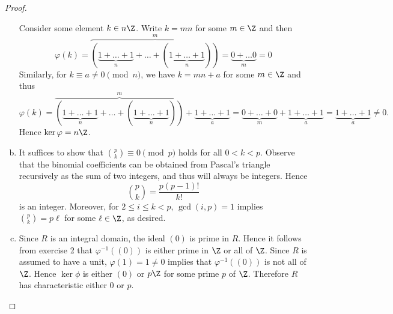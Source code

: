 \documentclass[10pt]{amsart}
\begin{document}
\begin{thm}
\begin{proof}
\begin{enumerate}[(a)]
        Consider some element $k \in n\Z$.  
        Write $k = mn$ for some $m \in \Z$ and then
        $$\varphi(k) = \overbrace{(\underbrace{1 + \ldots + 1}_n + \ldots + (\underbrace{1 + \ldots + 1}_n))}^m = \underbrace{0 + \ldots 0}_m = 0$$
        Similarly, for $k \equiv a \neq 0 \pmod{n}$, we have $k = mn + a$ for some $m \in \Z$ and thus
        $$\varphi(k) = \overbrace{(\underbrace{1 + \ldots + 1}_n + \ldots + (\underbrace{1 + \ldots + 1}_n))}^m +\underbrace{1 + \ldots + 1}_a = \underbrace{0 + \ldots + 0}_m + \underbrace{1 + \ldots + 1}_a = \underbrace{1 + \ldots + 1}_a \neq 0.$$
        Hence $\ker\varphi = n\Z$.
      \item
        It suffices to show that ${p \choose k} \equiv 0 \pmod{p}$ holds for all $0 < k < p$.
        Observe that the binomial coefficients can be obtained from Pascal's triangle recursively as the sum of two integers, and thus will always be integers.
        Hence
        $${p \choose k} = \frac{p(p-1)!}{k!}$$
        is an integer.
        Moreover, for $2 \leq i \leq k < p$, $\gcd(i,p) = 1$ implies ${p \choose k} = p\ell$ for some $\ell \in \Z$, as desired.
      \item
        Since $R$ is an integral domain, the ideal $(0)$ is prime in $R$.
        Hence it follows from exercise 2 that $\varphi^{-1}((0))$ is either prime in $\Z$ or all of $\Z$.
        Since $R$ is assumed to have a unit, $\varphi(1) = 1 \neq 0$ implies that $\varphi^{-1}((0))$ is not all of $\Z$.
        Hence $\ker\phi$ is either $(0)$ or $p\Z$ for some prime $p$ of $\Z$.
        Therefore $R$ has characteristic either 0 or $p$.
    \end{enumerate}
  \end{proof}
\end{thm}  
\end{document}
